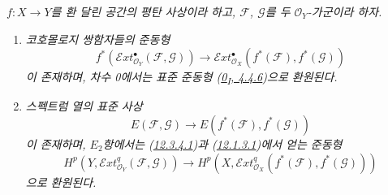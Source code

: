 \begin{proposition}[12.3.4]
\label{0.12.3.4-fr}
\emph{$f:X\to Y$를 환 달린 공간의 평탄 사상이라 하고,
$\mathcal F$, $\mathcal G$를 두 $\mathcal O_Y$-가군이라 하자.}
\begin{enumerate}
\item[{\rm(i)}] \emph{코호몰로지 쌍함자들의 준동형
\[
\label{0.12.3.4.1-fr}
\tag{12.3.4.1}
f^*(\mathcal{E}xt_{\mathcal O_Y}^{\bullet}(\mathcal F,\mathcal G))
\longrightarrow
\mathcal{E}xt_{\mathcal O_X}^{\bullet}(f^*(\mathcal F),f^*(\mathcal G))
\]
이 존재하며, 차수 0에서는 표준 준동형
(\hyperref[0.4.4.6-ko]{0\textsubscript{I}, 4.4.6})으로 환원된다.}

\item[{\rm(ii)}] \emph{스펙트럼 열의 표준 사상
\[
\label{0.12.3.4.2-fr}
\tag{12.3.4.2}
E(\mathcal F,\mathcal G)\longrightarrow
E(f^*(\mathcal F),f^*(\mathcal G))
\]
이 존재하며, $E_2$항에서는
(\hyperref[0.12.3.4.1-fr]{12.3.4.1})과
(\hyperref[0.12.1.3.1-fr]{12.1.3.1})에서 얻는 준동형
\[
\label{0.12.3.4.3-fr}
\tag{12.3.4.3}
H^p(Y,\mathcal{E}xt_{\mathcal O_Y}^q(\mathcal F,\mathcal G))
\longrightarrow
H^p(X,\mathcal{E}xt_{\mathcal O_X}^q(f^*(\mathcal F),f^*(\mathcal G)))
\]
으로 환원된다.}
\end{enumerate}
\end{proposition}

